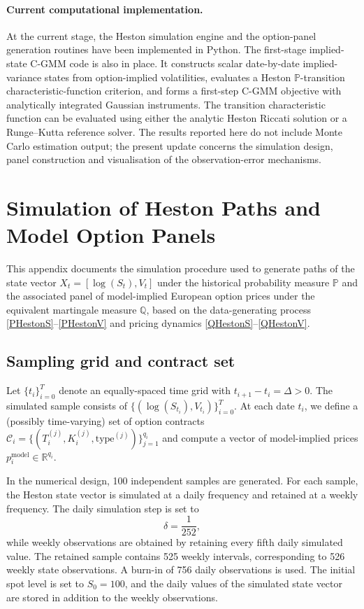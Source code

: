 \documentclass[11pt,a4paper,notitlepage]{article}
\numberwithin{equation}{section}
\begin{document}
\paragraph{Current computational implementation.}
At the current stage, the Heston simulation engine and the option-panel generation routines have been implemented in Python. The first-stage implied-state C-GMM code is also in place. It constructs scalar date-by-date implied-variance states from option-implied volatilities, evaluates a Heston $\mathbb{P}$-transition characteristic-function criterion, and forms a first-step C-GMM objective with analytically integrated Gaussian instruments. The transition characteristic function can be evaluated using either the analytic Heston Riccati solution or a Runge--Kutta reference solver. The results reported here do not include Monte Carlo estimation output; the present update concerns the simulation design, panel construction and visualisation of the observation-error mechanisms.

\newpage
\appendix
\section{Simulation of Heston Paths and Model Option Panels}
\label{app:sim_heston}

This appendix documents the simulation procedure used to generate paths of the state vector
$X_t=[\log(S_t),V_t]$ under the historical probability measure $\mathbb{P}$ and the associated
panel of model-implied European option prices under the equivalent martingale measure $\mathbb{Q}$,
based on the data-generating process \eqref{PHestonS}--\eqref{PHestonV} and pricing dynamics
\eqref{QHestonS}--\eqref{QHestonV}.

\subsection{Sampling grid and contract set}
Let $\{t_i\}_{i=0}^T$ denote an equally-spaced time grid with $t_{i+1}-t_i=\Delta>0$.
The simulated sample consists of $\{(\log(S_{t_i}),V_{t_i})\}_{i=0}^T$.
At each date $t_i$, we define a (possibly time-varying) set of option contracts
$\mathcal{C}_i=\{(T_i^{(j)},K_i^{(j)},\mathrm{type}^{(j)})\}_{j=1}^{q_i}$ and compute a vector of
model-implied prices $p_i^{\mathrm{model}}\in\mathbb{R}^{q_i}$.

In the numerical design, 100 independent samples are generated. For each sample, the Heston state vector is simulated at a daily frequency and retained at a weekly frequency. The daily simulation step is set to
\[
\delta=\frac{1}{252},
\]
while weekly observations are obtained by retaining every fifth daily simulated value. The retained sample contains 525 weekly intervals, corresponding to 526 weekly state observations. A burn-in of 756 daily observations is used. The initial spot level is set to $S_0=100$, and the daily values of the simulated state vector are stored in addition to the weekly observations.
\end{document}
